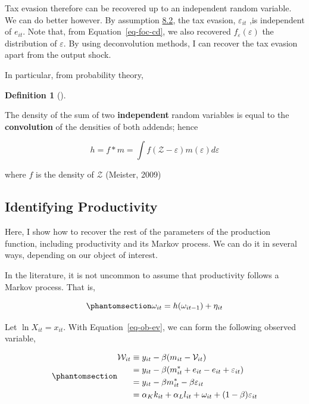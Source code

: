 \documentclass[
  12pt]{article}
\theoremstyle{definition}
\newtheorem{definition}{Definition}[section]
\theoremstyle{remark}
\newenvironment{fbx}[3]{\begin{tcolorbox}[enhanced, breakable,%
attach boxed title to top*={xshift=1.4pt},
boxed title style={boxrule=0.0mm, fuzzy shadow={1pt}{-1pt}{0mm}{0.1mm}{gray}, arc=.3em, rounded corners=east, sharp corners=west}, colframe=#1-color2, colbacktitle=#1-color1, colback = white, coltitle=black,  titlerule=0mm, toprule=0pt, bottomrule=.7pt, leftrule=.3em, rightrule=0pt, outer arc=.3em,  arc=0pt,	 sharp corners = east, left=.5em, bottomtitle=1mm, toptitle=1mm,title=\textbf{#2}\hspace{0.5em}{#3}]}
{\end{tcolorbox}}
\begin{document}
Tax evasion therefore can be recovered up to an independent random
variable. We can do better however. By assumption
\hyperref[ass-ind]{8.2}, the tax evasion, \(\varepsilon_{it}\) ,is
independent of \(e_{it}\). Note that, from Equation~\ref{eq-foc-cd}, we
also recovered \(f_{\varepsilon}(\varepsilon)\) the distribution of
\(\varepsilon\). By using deconvolution methods, I can recover the tax
evasion apart from the output shock.

In particular, from probability theory,

\begin{definition}[]\protect\hypertarget{def-conv}{}\label{def-conv}

\begin{fbx}{Definition}{Definition: }{Convolution}
\label{}
The density of the sum of two \textbf{independent} random variables is
equal to the \textbf{convolution} of the densities of both addends;
hence

\[
h = f*m = \int f(\mathcal Z - \varepsilon)m(\varepsilon)d\varepsilon
\]

where \(f\) is the density of \(\mathcal Z\) (Meister, 2009)

\end{fbx}

\end{definition}

\subsection{Identifying Productivity}\label{identifying-productivity}

Here, I show how to recover the rest of the parameters of the production
function, including productivity and its Markov process. We can do it in
several ways, depending on our object of interest.

In the literature, it is not uncommon to assume that productivity
follows a Markov process. That is,

\begin{equation}\phantomsection\label{eq-prod-markov}{
    \omega_{it}=h(\omega_{it-1})+\eta_{it}
}\end{equation}

Let \(\ln X_{it}=x_{it}\). With Equation~\ref{eq-ob-ev}, we can form the
following observed variable,

\begin{equation}\phantomsection\label{eq-big-w}{
\begin{aligned}
    \mathcal W_{it} & \equiv y_{it} - \beta (m_{it}-\mathcal{V}_{it})\\
    & = y_{it} - \beta (m^*_{it}+e_{it}-e_{it}+\varepsilon_{it})\\
    & = y_{it} - \beta m^*_{it}-\beta\varepsilon_{it}\\
    & = \alpha_K k_{it}+\alpha_L l_{it}+\omega_{it}+(1-\beta)\varepsilon_{it}
\end{aligned}
}\end{equation}
\end{document}
